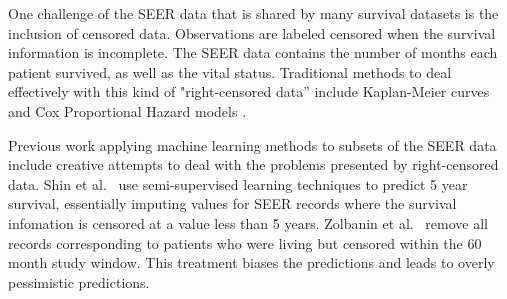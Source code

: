 \documentclass[10pt,letterpaper]{article}
\begin{document}



One challenge of the SEER data that is shared by many survival datasets is the inclusion of censored data.
Observations are labeled censored when the survival information is incomplete.
 The SEER data contains the number of months each patient survived, as well as the vital status.
Traditional methods to deal effectively with this kind of "right-censored data'' include Kaplan-Meier curves
and Cox Proportional Hazard models \cite{cam}. 

Previous work applying machine learning methods to subsets of the SEER data include creative attempts to deal with the problems presented by right-censored data. Shin et al.~\cite{ISI:000337467400005} use semi-supervised learning techniques to predict 5 year survival, essentially imputing values for SEER records where the survival infomation is censored at a value less than 5 years. Zolbanin et al.~\cite{ISI:000355882700012} remove all records corresponding to patients who were living but censored within the 60 month study window. This treatment biases the predictions and leads to overly pessimistic predictions. 
\end{document}
